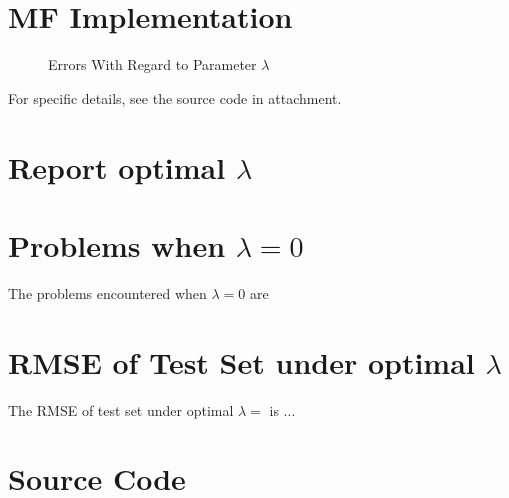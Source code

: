 \documentclass[11pt,a4paper]{article}
\begin{document}
\begin{titlepage}
    \maketitle
\end{titlepage}
\renewcommand{\contentsname}{Contents}
\begin{center} 
    \tableofcontents 
    \listoffigures
\end{center}
\newpage

\section{MF Implementation}

\begin{figure}[h]
    \centering
    \caption{Errors With Regard to Parameter $\lambda$}
\end{figure}
For specific details, see the source code in attachment.

\section{Report optimal $\lambda$}

\section{Problems when $\lambda = 0$}
The problems encountered when $\lambda = 0$ are 

\section{RMSE of Test Set under optimal $\lambda$}
The RMSE of test set under optimal $\lambda = $ is $..$.

\newpage
\appendix
\section{Source Code}


\end{document}
